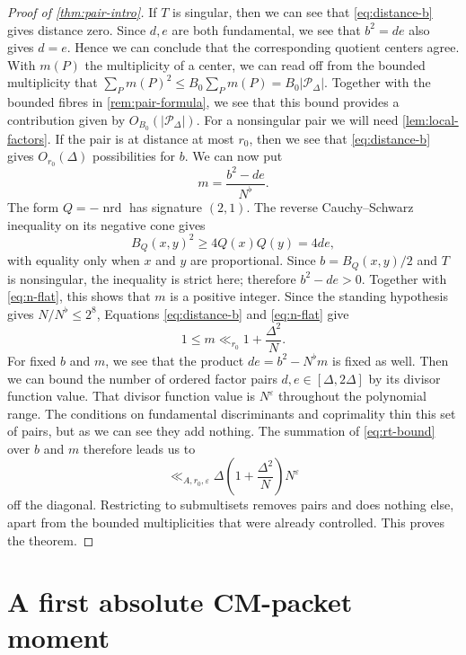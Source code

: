 \documentclass[11pt,reqno]{amsart}
\theoremstyle{definition}
\newcommand{\nrd}{\operatorname{nrd}}
\newcommand{\eps}{\varepsilon}
\begin{document}
\begin{proof}[Proof of \cref{thm:pair-intro}]
If $T$ is singular, then we can see that \eqref{eq:distance-b} gives distance zero. Since $d,e$ are both fundamental, we see that $b^2=de$ also gives $d=e$. Hence
we can conclude that the corresponding quotient centers agree. With $m(P)$ the multiplicity of a center, we can read off from the bounded
multiplicity that $\sum_Pm(P)^2\leq B_0\sum_Pm(P)=B_0|\mathscr P_\Delta|$. Together with the bounded fibres in \cref{rem:pair-formula}, we see that this
bound provides a contribution given by $O_{B_0}(|\mathscr P_\Delta|)$. 
For a nonsingular pair we will need \cref{lem:local-factors}. If the pair is at distance at most $r_0$, then we see that
\eqref{eq:distance-b} gives $O_{r_0}(\Delta)$ possibilities for $b$. We can now put
\[
 m=\frac{b^2-de}{N^\flat}.
\]
The form $Q=-\nrd$ has signature $(2,1)$. The reverse
Cauchy--Schwarz inequality on its negative cone gives
\[
 B_Q(x,y)^2\geq4Q(x)Q(y)=4de,
\]
with equality only when $x$ and $y$ are proportional. Since
$b=B_Q(x,y)/2$ and $T$ is nonsingular, the inequality is strict here;
therefore $b^2-de>0$. Together with \eqref{eq:n-flat}, this shows that
$m$ is a positive integer. Since the standing hypothesis gives
$N/N^\flat\leq2^8$, Equations
\eqref{eq:distance-b} and \eqref{eq:n-flat} give
\[
 1\leq m\ll_{r_0}1+\frac{\Delta^2}{N}.
\]
For fixed $b$ and $m$, we see that the product $de=b^2-N^\flat m$ is fixed as well. Then we can bound the number of ordered factor pairs $d,e\in[\Delta,2\Delta]$ by
its divisor function value. That divisor function value is $N^\eps$ throughout the
polynomial range. The conditions on fundamental discriminants and coprimality thin this set of
pairs, but as we can see they add nothing. The summation of \eqref{eq:rt-bound} over $b$ and $m$ therefore leads us to
\[ \ll_{A,r_0,\eps} \Delta\left(1+\frac{\Delta^2}{N}\right)N^\eps \] off the
diagonal. Restricting to submultisets removes pairs and does nothing else, apart from
the bounded multiplicities that were already controlled. This
proves the theorem.
\end{proof}

\section{A first absolute CM-packet moment}\label{sec:first-moment}
\end{document}
